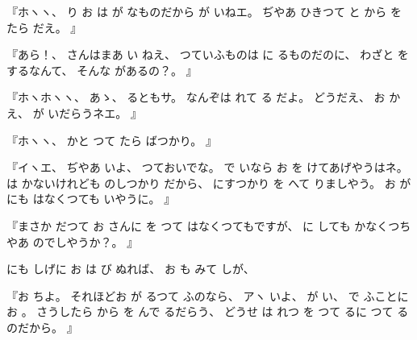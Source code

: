 %
『ホヽヽ、
%
り
お
は
が
なものだから
が
いねエ。
%
ぢやあ
ひきつて
と
から
を
たら
だえ。
』

%
『あら！、
%
さんはまあ
い
ねえ、
%
つていふものは
に
るものだのに、
%
わざと
をするなんて、
%
そんな
があるの？。
』

%
『ホヽホヽヽ、
%
あゝ、
%
るともサ。
%
なんぞは
れて
る
だよ。
%
どうだえ、
%
お
かえ、
%
が
いだらうネエ。
』

%
『ホヽヽ、
%
かと
つて
たら
ばつかり。
』

%
『イヽエ、
%
ぢやあ
いよ、
%
つておいでな。
%
で
いなら
お
を
けてあげやうはネ。
%
は
かないけれども
のしつかり
だから、
%
にすつかり
を
へて
りましやう。
%
お
が
にも
はなくつても
いやうに。
』

%
『まさか
だつて
お
さんに
を
つて
はなくつてもですが、
%
に
しても
かなくつちやあ
のでしやうか？。
』

%
にも
しげに
お
は
び
ぬれば、
%
お
も
みて
しが、

%
『お
ちよ。
%
それほどお
が
るつて
ふのなら、
%
アヽ
いよ、
%
が
い、
%
で
ふことに
お
。
%
さうしたら
から
を
んで
るだらう、
%
どうせ
は
れつ
を
つて
るに
つて
るのだから。
』

